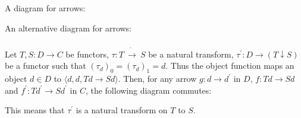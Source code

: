 \documentclass{article}
\begin{document}
A diagram for arrows:

\begin{center}
\end{center}

An alternative diagram for arrows:

\begin{center}
\end{center}

\subsubsection{}

\showArt

Let $T, S : D \rightarrow C$ be functors, $\tau : T\ \dot{\rightarrow}\ S$ be a natural transform, $\tau^\prime : D \rightarrow (T \downarrow S)$ be a functor such that $(\tau_d)_0 = (\tau_d)_1 = d$. Thus the object function maps an object $d \in D$ to $\langle d, d, Td \rightarrow Sd \rangle$. Then, for any arrow $g : d \rightarrow d^\prime$ in $D$, $f : Td \rightarrow Sd$ and $f^\prime : Td^\prime \rightarrow Sd^\prime$ in $C$, the following diagram commutes:

\begin{center}
\end{center}

This means that $\tau^\prime$ is a natural transform on $T$ to $S$.

\subsubsection{}
\end{document}
